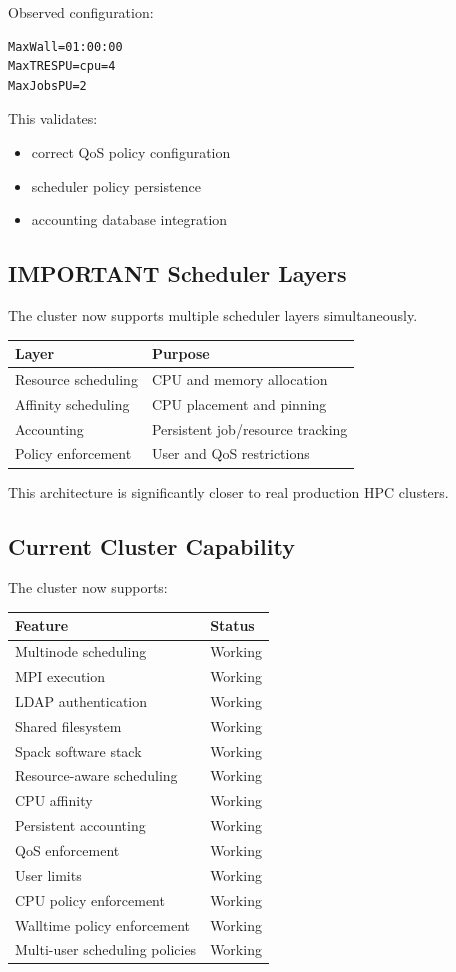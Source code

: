 \documentclass[11pt]{article}
\begin{document}
Observed configuration:

\begin{verbatim}
MaxWall=01:00:00
MaxTRESPU=cpu=4
MaxJobsPU=2
\end{verbatim}

This validates:

\begin{itemize}
\item correct QoS policy configuration
\item scheduler policy persistence
\item accounting database integration
\end{itemize}
\subsection{IMPORTANT Scheduler Layers}
\label{sec:org204a02e}

The cluster now supports multiple scheduler layers simultaneously.

\begin{center}
\begin{tabular}{ll}
Layer & Purpose\\
\hline
Resource scheduling & CPU and memory allocation\\
Affinity scheduling & CPU placement and pinning\\
Accounting & Persistent job/resource tracking\\
Policy enforcement & User and QoS restrictions\\
\end{tabular}
\end{center}

This architecture is significantly closer to real production HPC
clusters.
\subsection{Current Cluster Capability}
\label{sec:orgcd653c3}

The cluster now supports:

\begin{center}
\begin{tabular}{ll}
Feature & Status\\
\hline
Multinode scheduling & Working\\
MPI execution & Working\\
LDAP authentication & Working\\
Shared filesystem & Working\\
Spack software stack & Working\\
Resource-aware scheduling & Working\\
CPU affinity & Working\\
Persistent accounting & Working\\
QoS enforcement & Working\\
User limits & Working\\
CPU policy enforcement & Working\\
Walltime policy enforcement & Working\\
Multi-user scheduling policies & Working\\
\end{tabular}
\end{center}
\end{document}
